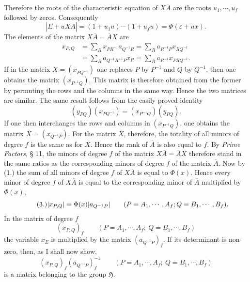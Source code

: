 \documentclass[11pt]{article}
\newcommand{\Hgr}{\mathfrak{H}}
\newcommand{\eps}{\varepsilon}
\begin{document}
Therefore the roots of the characteristic equation of $X\overline{A}$ are the roots $u_1,\cdots,u_f$ followed by zeros. Consequently
\begin{equation}\tag{1.}
|E+uX\overline{A}|=(1+u_1u)\cdots(1+u_fu)=\Phi(\eps+ux).
\end{equation}
The elements of the matrix $X\overline{A}=\overline{A}X$ are
\begin{equation}\tag{2.}
\begin{aligned}
x_{P,Q}&=\sum_R x_{PR^{-1}}a_{Q^{-1}R}
       =\sum_R a_{R^{-1}P}x_{RQ^{-1}}\\
      &=\sum_R a_{Q^{-1}R^{-1}P}x_R
       =\sum_R a_{R^{-1}}x_{PRQ^{-1}}.
\end{aligned}
\end{equation}
If in the matrix $X=(x_{PQ^{-1}})$ one replaces $P$ by $P^{-1}$ and $Q$ by $Q^{-1}$, then one obtains the matrix $(x_{P^{-1}Q})$. This matrix is therefore obtained from the former by permuting the rows and the columns in the same way. Hence the two matrices are similar. The same result follows from the easily proved identity
\[
(y_{PQ})(x_{PQ^{-1}})=(x_{P^{-1}Q})(y_{PQ}).
\]
If one then interchanges the rows and columns in $(x_{P^{-1}Q})$, one obtains the matrix $\overline{X}=(x_{Q^{-1}P})$. For the matrix $\overline{X}$, therefore, the totality of all minors of degree $f$ is the same as for $X$. Hence the rank of $\overline{A}$ is also equal to $f$. By \emph{Prime Factors}, § 11, the minors of degree $f$ of the matrix $X\overline{A}=\overline{A}X$ therefore stand in the same ratios as the corresponding minors of degree $f$ of the matrix $\overline{A}$. Now by (1.) the sum of all minors of degree $f$ of $X\overline{A}$ is equal to $\Phi(x)$. Hence every minor of degree $f$ of $X\overline{A}$ is equal to the corresponding minor of $\overline{A}$ multiplied by $\Phi(x)$,
\begin{equation}\tag{3.}
|x_{P,Q}|=\Phi(x)|a_{Q^{-1}P}|
\qquad(P=A_1,\cdots,A_f;\\ Q=B_1,\cdots,B_f).
\end{equation}
In the matrix of degree $f$
\[
(x_{P,Q})_f\qquad(P=A_1,\cdots,A_f;\ Q=B_1,\cdots,B_f)
\]
the variable $x_E$ is multiplied by the matrix $(a_{Q^{-1}P})_f$. If its determinant is non-zero, then, as I shall now show,
\begin{equation}\tag{4.}
(x_{P,Q})_f(a_{Q^{-1}P})_f^{-1}
\qquad(P=A_1,\cdots,A_f;\ Q=B_1,\cdots,B_f)
\end{equation}
is a matrix belonging to the group $\Hgr$.
\end{document}
